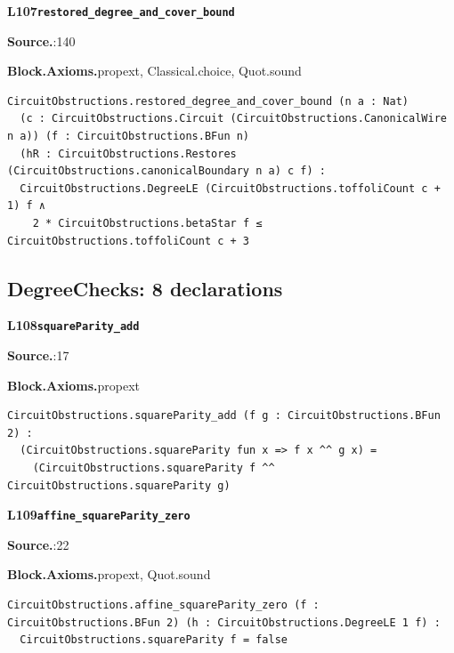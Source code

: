 \par\medskip\noindent\begin{minipage}{\textwidth}
{\small\bfseries L107\enspace\texttt{restored\_degree\_and\_cover\_bound}\par}
{\footnotesize\raggedright\textbf{Source.}\enspace{}:140\par
\textbf{Block.}\quad\textbf{Axioms.}\enspace propext, Classical.choice, Quot.sound\par}\nopagebreak
\begin{lstlisting}
CircuitObstructions.restored_degree_and_cover_bound (n a : Nat)
  (c : CircuitObstructions.Circuit (CircuitObstructions.CanonicalWire n a)) (f : CircuitObstructions.BFun n)
  (hR : CircuitObstructions.Restores (CircuitObstructions.canonicalBoundary n a) c f) :
  CircuitObstructions.DegreeLE (CircuitObstructions.toffoliCount c + 1) f ∧
    2 * CircuitObstructions.betaStar f ≤ CircuitObstructions.toffoliCount c + 3
\end{lstlisting}
\end{minipage}\par

\subsection*{DegreeChecks: 8 declarations}
\par\medskip\noindent\begin{minipage}{\textwidth}
{\small\bfseries L108\enspace\texttt{squareParity\_add}\par}
{\footnotesize\raggedright\textbf{Source.}\enspace{}:17\par
\textbf{Block.}\quad\textbf{Axioms.}\enspace propext\par}\nopagebreak
\begin{lstlisting}
CircuitObstructions.squareParity_add (f g : CircuitObstructions.BFun 2) :
  (CircuitObstructions.squareParity fun x => f x ^^ g x) =
    (CircuitObstructions.squareParity f ^^ CircuitObstructions.squareParity g)
\end{lstlisting}
\end{minipage}\par

\par\medskip\noindent\begin{minipage}{\textwidth}
{\small\bfseries L109\enspace\texttt{affine\_squareParity\_zero}\par}
{\footnotesize\raggedright\textbf{Source.}\enspace{}:22\par
\textbf{Block.}\quad\textbf{Axioms.}\enspace propext, Quot.sound\par}\nopagebreak
\begin{lstlisting}
CircuitObstructions.affine_squareParity_zero (f : CircuitObstructions.BFun 2) (h : CircuitObstructions.DegreeLE 1 f) :
  CircuitObstructions.squareParity f = false
\end{lstlisting}
\end{minipage}\par

